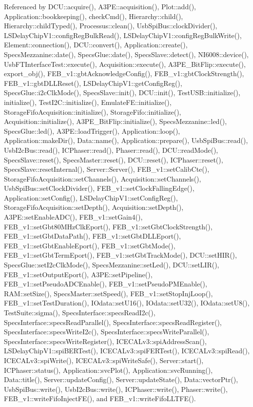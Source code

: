 Referenced by DCU::acquire(), A3PE::acquisition(), Plot::add(), Application::bookkeeping(), checkCmd(), Hierarchy::child(), Hierarchy::childTyped(), Processus::clean(), UsbSpiBus::clockDivider(), LSDelayChipV1::configRegBulkRead(), LSDelayChipV1::configRegBulkWrite(), Element::connection(), DCU::convert(), Application::create(), SpecsMezzanine::date(), SpecsGlue::date(), SpecsSlave::detect(), NI6008::device(), UsbFTInterfaceTest::execute(), Acquisition::execute(), A3PE\_\-BitFlip::execute(), export\_\-obj(), FEB\_\-v1::gbtAcknowledgeConfig(), FEB\_\-v1::gbtClockStrength(), FEB\_\-v1::gbtDLLReset(), LSDelayChipV1::getConfigReg(), SpecsGlue::i2cClkMode(), SpecsSlave::init(), DCU::init(), TestUSB::initialize(), initialize(), TestI2C::initialize(), EmulateFE::initialize(), StorageFifoAcquisition::initialize(), StorageFifo::initialize(), Acquisition::initialize(), A3PE\_\-BitFlip::initialize(), SpecsMezzanine::led(), SpecsGlue::led(), A3PE::loadTrigger(), Application::loop(), Application::makeDir(), Data::name(), Application::prepare(), UsbSpiBus::read(), UsbI2cBus::read(), ICPhaser::read(), Phaser::read(), DCU::readMode(), SpecsSlave::reset(), SpecsMaster::reset(), DCU::reset(), ICPhaser::reset(), SpecsSlave::resetInternal(), Server::Server(), FEB\_\-v1::setCalibCte(), StorageFifoAcquisition::setChannels(), Acquisition::setChannels(), UsbSpiBus::setClockDivider(), FEB\_\-v1::setClockFallingEdge(), Application::setConfig(), LSDelayChipV1::setConfigReg(), StorageFifoAcquisition::setDepth(), Acquisition::setDepth(), A3PE::setEnableADC(), FEB\_\-v1::setGain4(), FEB\_\-v1::setGbt80MHzClkEport(), FEB\_\-v1::setGbtClockStrength(), FEB\_\-v1::setGbtDataPath(), FEB\_\-v1::setGbtDLLEport(), FEB\_\-v1::setGbtEnableEport(), FEB\_\-v1::setGbtMode(), FEB\_\-v1::setGbtTermEport(), FEB\_\-v1::setGbtTrackMode(), DCU::setHIR(), SpecsGlue::setI2cClkMode(), SpecsMezzanine::setLed(), DCU::setLIR(), FEB\_\-v1::setOutputEport(), A3PE::setPipeline(), FEB\_\-v1::setPseudoADCEnable(), FEB\_\-v1::setPseudoPMEnable(), RAM::setSize(), SpecsMaster::setSpeed(), FEB\_\-v1::setStopInjLoop(), FEB\_\-v1::setTestDuration(), IOdata::setU16(), IOdata::setU32(), IOdata::setU8(), TestSuite::sigma(), SpecsInterface::specsReadI2c(), SpecsInterface::specsReadParallel(), SpecsInterface::specsReadRegister(), SpecsInterface::specsWriteI2c(), SpecsInterface::specsWriteParallel(), SpecsInterface::specsWriteRegister(), ICECALv3::spiAddressScan(), LSDelayChipV1::spiBERTest(), ICECALv3::spiFERTest(), ICECALv3::spiRead(), ICECALv3::spiWrite(), ICECALv3::spiWriteSafe(), Server::start(), ICPhaser::status(), Application::svcPlot(), Application::svcRunning(), Data::title(), Server::updateConfig(), Server::updateState(), Data::vectorPtr(), UsbSpiBus::write(), UsbI2cBus::write(), ICPhaser::write(), Phaser::write(), FEB\_\-v1::writeFifoInjectFE(), and FEB\_\-v1::writeFifoLLTFE().


